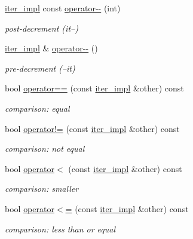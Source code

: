 \begin{DoxyCompactItemize}
\hyperlink{classnlohmann_1_1detail_1_1iter__impl}{iter\+\_\+impl} const \hyperlink{classnlohmann_1_1detail_1_1iter__impl_a1fc43e764467b8ea4a4cdd01f629d757}{operator-\/-\/} (int)
\begin{DoxyCompactList}\small\item\em post-\/decrement (it--) \end{DoxyCompactList}\item 
\hyperlink{classnlohmann_1_1detail_1_1iter__impl}{iter\+\_\+impl} \& \hyperlink{classnlohmann_1_1detail_1_1iter__impl_a84e689fb581d651d130039f7cb81494a}{operator-\/-\/} ()
\begin{DoxyCompactList}\small\item\em pre-\/decrement (--it) \end{DoxyCompactList}\item 
bool \hyperlink{classnlohmann_1_1detail_1_1iter__impl_a2b592605b63ae7f5401996ffa3b14393}{operator==} (const \hyperlink{classnlohmann_1_1detail_1_1iter__impl}{iter\+\_\+impl} \&other) const
\begin{DoxyCompactList}\small\item\em comparison\+: equal \end{DoxyCompactList}\item 
bool \hyperlink{classnlohmann_1_1detail_1_1iter__impl_aeab0e2b5da70b3bdebecd5b1a6ee66a6}{operator!=} (const \hyperlink{classnlohmann_1_1detail_1_1iter__impl}{iter\+\_\+impl} \&other) const
\begin{DoxyCompactList}\small\item\em comparison\+: not equal \end{DoxyCompactList}\item 
bool \hyperlink{classnlohmann_1_1detail_1_1iter__impl_a0d14cd76203e00bdcef6a64a5d055cc7}{operator$<$} (const \hyperlink{classnlohmann_1_1detail_1_1iter__impl}{iter\+\_\+impl} \&other) const
\begin{DoxyCompactList}\small\item\em comparison\+: smaller \end{DoxyCompactList}\item 
bool \hyperlink{classnlohmann_1_1detail_1_1iter__impl_ac6f71b36d7c87e427d1fee83f2600fad}{operator$<$=} (const \hyperlink{classnlohmann_1_1detail_1_1iter__impl}{iter\+\_\+impl} \&other) const
\begin{DoxyCompactList}\small\item\em comparison\+: less than or equal \end{DoxyCompactList}\item 

\end{DoxyCompactItemize}

